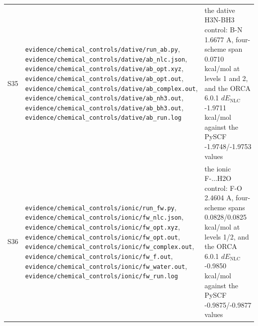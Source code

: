 \documentclass[11pt]{article}
\begin{document}
\begin{longtable}{c>{\raggedright\arraybackslash}p{}>{\raggedright\arraybackslash}p{}}
S35 & \texttt{evidence/\allowbreak{}chemical\_\allowbreak{}controls/\allowbreak{}dative/\allowbreak{}run\_\allowbreak{}ab.py}, \texttt{evidence/\allowbreak{}chemical\_\allowbreak{}controls/\allowbreak{}dative/\allowbreak{}ab\_\allowbreak{}nlc.json}, \texttt{evidence/\allowbreak{}chemical\_\allowbreak{}controls/\allowbreak{}dative/\allowbreak{}ab\_\allowbreak{}opt.xyz}, \texttt{evidence/\allowbreak{}chemical\_\allowbreak{}controls/\allowbreak{}dative/\allowbreak{}ab\_\allowbreak{}opt.out}, \texttt{evidence/\allowbreak{}chemical\_\allowbreak{}controls/\allowbreak{}dative/\allowbreak{}ab\_\allowbreak{}complex.out}, \texttt{evidence/\allowbreak{}chemical\_\allowbreak{}controls/\allowbreak{}dative/\allowbreak{}ab\_\allowbreak{}nh3.out}, \texttt{evidence/\allowbreak{}chemical\_\allowbreak{}controls/\allowbreak{}dative/\allowbreak{}ab\_\allowbreak{}bh3.out}, \texttt{evidence/\allowbreak{}chemical\_\allowbreak{}controls/\allowbreak{}dative/\allowbreak{}ab\_\allowbreak{}run.log} & the dative H3N-BH3 control: B-N 1.6677 A, four-scheme span 0.0710 kcal/mol at levels 1 and 2, and the ORCA 6.0.1 $dE_{\mathrm{NLC}}$ -1.9711 kcal/mol against the PySCF -1.9748/-1.9753 values \\
S36 & \texttt{evidence/\allowbreak{}chemical\_\allowbreak{}controls/\allowbreak{}ionic/\allowbreak{}run\_\allowbreak{}fw.py}, \texttt{evidence/\allowbreak{}chemical\_\allowbreak{}controls/\allowbreak{}ionic/\allowbreak{}fw\_\allowbreak{}nlc.json}, \texttt{evidence/\allowbreak{}chemical\_\allowbreak{}controls/\allowbreak{}ionic/\allowbreak{}fw\_\allowbreak{}opt.xyz}, \texttt{evidence/\allowbreak{}chemical\_\allowbreak{}controls/\allowbreak{}ionic/\allowbreak{}fw\_\allowbreak{}opt.out}, \texttt{evidence/\allowbreak{}chemical\_\allowbreak{}controls/\allowbreak{}ionic/\allowbreak{}fw\_\allowbreak{}complex.out}, \texttt{evidence/\allowbreak{}chemical\_\allowbreak{}controls/\allowbreak{}ionic/\allowbreak{}fw\_\allowbreak{}f.out}, \texttt{evidence/\allowbreak{}chemical\_\allowbreak{}controls/\allowbreak{}ionic/\allowbreak{}fw\_\allowbreak{}water.out}, \texttt{evidence/\allowbreak{}chemical\_\allowbreak{}controls/\allowbreak{}ionic/\allowbreak{}fw\_\allowbreak{}run.log} & the ionic F-...H2O control: F-O 2.4604 A, four-scheme spans 0.0828/0.0825 kcal/mol at levels 1/2, and the ORCA 6.0.1 $dE_{\mathrm{NLC}}$ -0.9850 kcal/mol against the PySCF -0.9875/-0.9877 values \\

\end{longtable}
\end{document}
